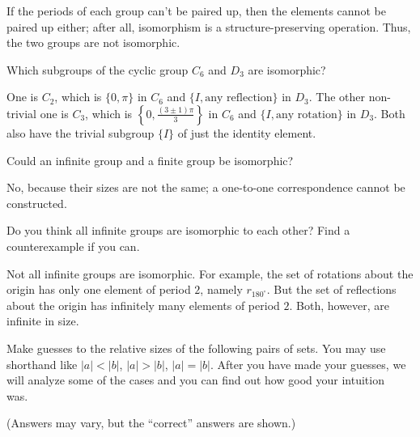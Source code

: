 \documentclass[../key.tex]{subfiles}
\begin{document}
\noindent If the periods of each group can't be paired up, then the elements cannot be paired up either; after all, isomorphism is a structure-preserving operation. Thus, the two groups are not isomorphic.

\begin{inner_problem}
\item Which subgroups of the cyclic group $C_6$ and $D_3$ are isomorphic?
\end{inner_problem}

\noindent One is $C_2$, which is $\{0,\pi\}$ in $C_6$ and $\{I,\text{any reflection}\}$ in $D_3$. The other non-trivial one is $C_3$, which is $\left\{0,\frac{(3\pm 1)\pi}{3}\right\}$ in $C_6$ and $\{I,\text{any rotation}\}$ in $D_3$. Both also have the trivial subgroup $\{I\}$ of just the identity element.

\begin{outer_problem}
\item Could an infinite group and a finite group be isomorphic?
\end{outer_problem}

\noindent No, because their sizes are not the same; a one-to-one correspondence cannot be constructed.

\begin{outer_problem}
\item Do you think all infinite groups are isomorphic to each other? Find a counterexample if you can.
\end{outer_problem}

\noindent Not all infinite groups are isomorphic. For example, the set of rotations about the origin has only one element of period $2$, namely $r_{180^\circ}$. But the set of reflections about the origin has infinitely many elements of period $2$. Both, however, are infinite in size.

\begin{outer_problem}
\item Make guesses to the relative sizes of the following pairs of sets. You may use shorthand like $|a| < |b|$, $|a| > |b|$, $|a| = |b|$. After you have made your guesses, we will analyze some of the cases and you can find out how good your intuition was.~\label{prob:infinity_guesses}
\end{outer_problem}

\noindent (Answers may vary, but the ``correct'' answers are shown.)
\end{document}

